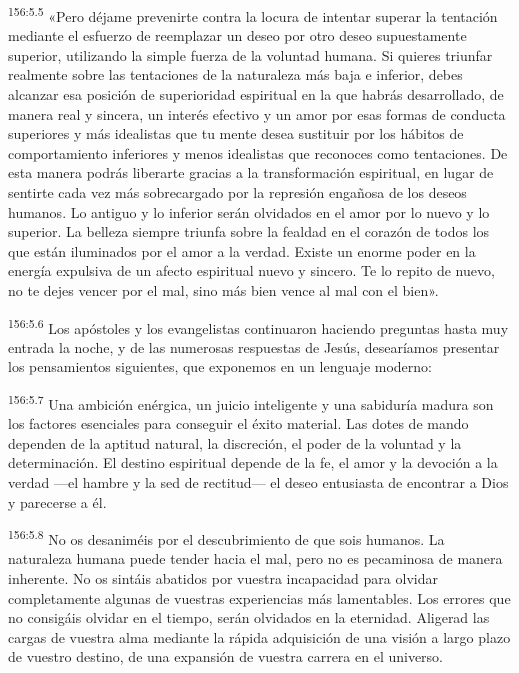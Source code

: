 \par 
\textsuperscript{156:5.5} «Pero déjame prevenirte contra la locura de intentar superar la tentación mediante el esfuerzo de reemplazar un deseo por otro deseo supuestamente superior, utilizando la simple fuerza de la voluntad humana. Si quieres triunfar realmente sobre las tentaciones de la naturaleza más baja e inferior, debes alcanzar esa posición de superioridad espiritual en la que habrás desarrollado, de manera real y sincera, un interés efectivo y un amor por esas formas de conducta superiores y más idealistas que tu mente desea sustituir por los hábitos de comportamiento inferiores y menos idealistas que reconoces como tentaciones. De esta manera podrás liberarte gracias a la transformación espiritual, en lugar de sentirte cada vez más sobrecargado por la represión engañosa de los deseos humanos. Lo antiguo y lo inferior serán olvidados en el amor por lo nuevo y lo superior. La belleza siempre triunfa sobre la fealdad en el corazón de todos los que están iluminados por el amor a la verdad. Existe un enorme poder en la energía expulsiva de un afecto espiritual nuevo y sincero. Te lo repito de nuevo, no te dejes vencer por el mal, sino más bien vence al mal con el bien».

\par 
\textsuperscript{156:5.6} Los apóstoles y los evangelistas continuaron haciendo preguntas hasta muy entrada la noche, y de las numerosas respuestas de Jesús, desearíamos presentar los pensamientos siguientes, que exponemos en un lenguaje moderno:

\par 
\textsuperscript{156:5.7} Una ambición enérgica, un juicio inteligente y una sabiduría madura son los factores esenciales para conseguir el éxito material. Las dotes de mando dependen de la aptitud natural, la discreción, el poder de la voluntad y la determinación. El destino espiritual depende de la fe, el amor y la devoción a la verdad ---el hambre y la sed de rectitud--- el deseo entusiasta de encontrar a Dios y parecerse a él.

\par 
\textsuperscript{156:5.8} No os desaniméis por el descubrimiento de que sois humanos. La naturaleza humana puede tender hacia el mal, pero no es pecaminosa de manera inherente. No os sintáis abatidos por vuestra incapacidad para olvidar completamente algunas de vuestras experiencias más lamentables. Los errores que no consigáis olvidar en el tiempo, serán olvidados en la eternidad. Aligerad las cargas de vuestra alma mediante la rápida adquisición de una visión a largo plazo de vuestro destino, de una expansión de vuestra carrera en el universo.

